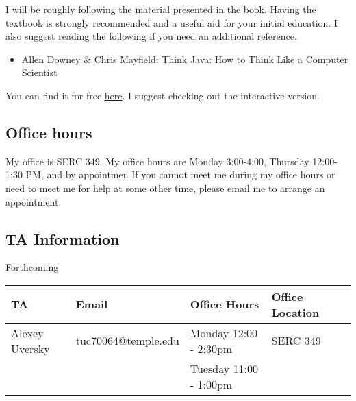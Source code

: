 \documentclass[10pt, letter]{article}
\begin{document}
I will be roughly following the material presented in the book.
Having the textbook is  strongly recommended and a useful aid for your initial education.
I also suggest reading the following if you need an additional reference.

\begin{itemize}
	\item Allen Downey \& Chris Mayfield: Think Java: How to Think Like a Computer Scientist
\end{itemize}

You can find it for free \href{http://greenteapress.com/wp/think-java/}{here}.   I suggest checking out the interactive version.

\subsection*{Office hours}
My office is SERC 349.
My office hours are Monday 3:00-4:00, Thursday 12:00-1:30 PM, and by appointmen
If you cannot meet me during my office hours or need to meet me for help at some other time, please email me to arrange an appointment. 


\subsection*{TA Information}
Forthcoming

{\footnotesize
	\begin{tabular}{l l l l l}
		TA & Email &Office Hours & Office Location \\ \hline

		Alexey Uversky &tuc70064@temple.edu& Monday 12:00 - 2:30pm﻿ & SERC 349 \\
		﻿﻿
		 & &Tuesday 11:00 - 1:00pm & \\
	\end{tabular}
}






\end{document}
